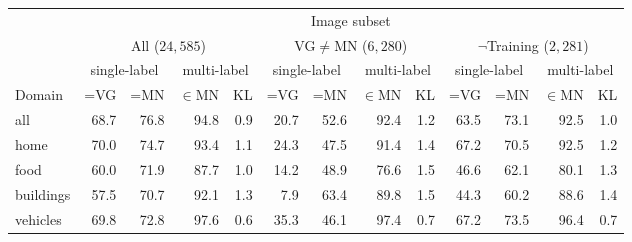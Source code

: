 \begin{table}
	\centering
	\small
	\begin{tabular}{l@{~}|@{~}r@{~}r@{~}rr@{~}|@{~}r@{~}r@{~}rr@{~}|@{~}r@{~}r@{~}rr}
		\toprule
		& \multicolumn{12}{c}{Image subset} \\
		&	\multicolumn{4}{c}{All ($24,585$)} 
		& \multicolumn{4}{c}{VG$\neq$MN ($6,280$)}
		& \multicolumn{4}{c}{$\neg$Training ($2,281$)} \\
		\midrule
		&  \multicolumn{2}{c}{single-label}
		&  \multicolumn{2}{c}{multi-label}
		&  \multicolumn{2}{c}{single-label}
		&  \multicolumn{2}{c}{multi-label}
		&  \multicolumn{2}{c}{single-label}
		&  \multicolumn{2}{c}{multi-label} \\
		Domain	 &  =VG & =MN & $\in$MN  &  KL
		&  =VG & =MN & $\in$MN  & KL
		&  =VG & =MN & $\in$MN  & KL\\ 
		\midrule \vspace{.6ex}
		all            &               68.7 &                 76.8 &                   94.8 &            0.9 &            20.7 &              52.6 &                92.4 &         1.2 &             63.5 &               73.1 &                 92.5 &          1.0 \\ 
		home           &               70.0 &                 74.7 &                   93.4 &            1.1 &            24.3 &              47.5 &                91.4 &         1.4 &             67.2 &               70.5 &                 92.5 &          1.2 \\
		food           &               60.0 &                 71.9 &                   87.7 &            1.0 &            14.2 &              48.9 &                76.6 &         1.5 &             46.6 &               62.1 &                 80.1 &          1.3 \\
		buildings      &               57.5 &                 70.7 &                   92.1 &            1.3 &             7.9 &              63.4 &                89.8 &         1.5 &             44.3 &               60.2 &                 88.6 &          1.4 \\
		vehicles       &               69.8 &                 72.8 &                   97.6 &            0.6 &            35.3 &              46.1 &                97.4 &         0.7 &             67.2 &               73.5 &                 96.4 &          0.7 \\

\end{tabular}
\end{table}
